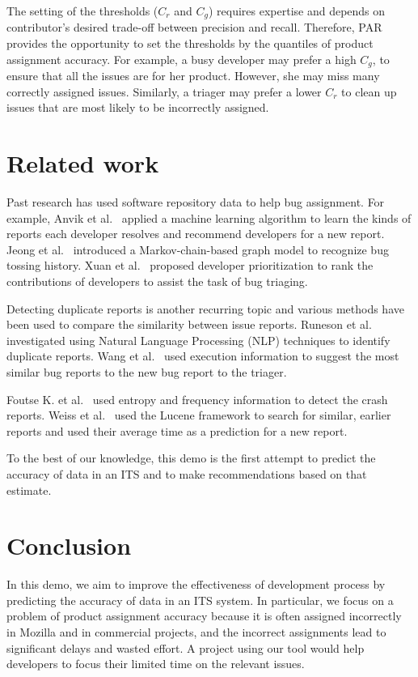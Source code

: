 \documentclass{sig-alternate}
\begin{document}
The setting of the thresholds ($C_r$ and $C_g$) requires expertise
and depends on contributor's desired trade-off between precision and
recall. Therefore, PAR provides the opportunity to set the
thresholds by the quantiles of product assignment accuracy. For
example, a busy developer may prefer a high $C_g$,
to ensure that all the issues are for her product. However, she may
miss many correctly assigned issues. Similarly, a triager may prefer
a lower $C_r$ to clean up issues that are most likely to be
incorrectly assigned.

\vspace{-.275cm}
\section{Related work}\label{s:relatedwork}

Past research has used software repository data to help bug assignment.
For example, Anvik et al.~\cite{Anvik2006} applied a machine learning algorithm to learn
the kinds of reports each developer resolves and recommend developers for
a new report.
Jeong et al.~\cite{Jeong2009} introduced a Markov-chain-based
graph model to recognize bug tossing history.
Xuan et al.~\cite{xuan2012} proposed developer
prioritization to rank the contributions of developers to assist the task of bug triaging.

Detecting duplicate reports is another recurring topic and various methods have
been used to compare the similarity between issue reports. Runeson et al. ~\cite{Runeson07}
investigated using Natural Language Processing (NLP) techniques to identify
duplicate reports. Wang et al.~\cite{Wang2008} used execution information to suggest
the most similar bug reports to the new bug report to the triager.

Foutse K. et al.~\cite{hassan2011} used
entropy and frequency information to detect the crash reports. Weiss et al.~\cite{Weiss07} used
the Lucene framework to search for similar, earlier reports and used their average time
as a prediction for a new report.

To the best of our knowledge, this demo is the first attempt to
predict the accuracy of data in an ITS and to make recommendations
based on that estimate.

\vspace{-.2cm}
\section{Conclusion}\label{s:conclusion}
In this demo, we aim to improve the effectiveness of development
process by predicting the accuracy of data in an ITS
system. In particular, we focus on a problem of product assignment
accuracy because it is often assigned incorrectly in Mozilla and
in commercial projects, and the incorrect assignments lead to
significant delays and wasted effort. A project using our tool
would help developers to focus their limited time on
the relevant issues.
\end{document}
